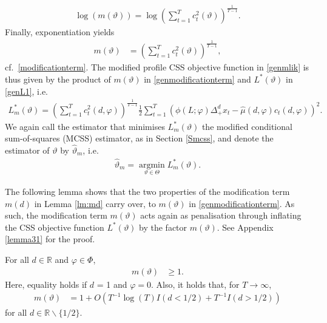 {{\begin{align*}
   \log\left(  m(\vartheta) \right) =  \log \left( \sum_{t = 1}^T c^2_{t}(\vartheta) \right)^{\frac{1}{T-1}}.
\end{align*}
Finally, exponentiation yields
\begin{align}
     m(\vartheta) &= \left( \sum_{t = 1}^T c^2_t(\vartheta)  \right)^{\frac{1}{T-1}}, \label{genmodificationterm}
\end{align}
cf.\ \eqref{modificationterm}. The modified profile CSS objective function in \eqref{genmlik} is thus given by the product of $ m(\vartheta)$ in \eqref{genmodificationterm} and $ L^*(\vartheta)$ in \eqref{genL1}, i.e.\
\begin{align*}
   L_m^*(\vartheta) = \left( \sum_{t = 1}^T c^2_t(d,\varphi)  \right)^{\frac{1}{T-1}}  \frac{1}{2} \sum_{t = 1}^T \left(  \phi(L;\varphi)\Delta_{+}^{d} x_t- \hat{\mu}(d,\varphi) c_t(d,\varphi)  \right)^2 .
\end{align*}
We again call the estimator that minimises $L_m^*(\vartheta)$ the modified conditional sum-of-squares (MCSS) estimator, as in Section \ref{Smcss}, and denote the estimator of $\vartheta$ by $\hat{\vartheta}_{m}$, i.e.\,
\begin{align}
    \hat{\vartheta}_{m} = \operatorname*{argmin}_{\vartheta \in \Theta} L^*_{m}(\vartheta).  \label{MCSSgen1}
\end{align}

The following lemma shows that the two properties of the modification term $m(d)$ in Lemma \ref{lm:md} carry over, to $m(\vartheta)$ in \eqref{genmodificationterm}. As such, the modification term $m(\vartheta)$ acts again as penalisation through inflating the CSS objective function $L^*(\vartheta)$ by the factor $m(\vartheta)$. See Appendix \ref{lemma31} for the proof.     

\begin{lemma} \label{gen:lm:md}
  For all $d \in \mathbb{R} $ and $\varphi \in \Phi$,
  \begin{align}
    m(\vartheta) &\geq 1. \label{genmqeq1}
    \end{align}
Here, equality holds if $d$ = 1 and $\varphi = 0$.
Also, it holds that, for $T \rightarrow \infty$,
    \begin{align}
    m(\vartheta) &= 1 + O(T^{-1}\log(T) I(d < 1/2) + T^{-1} I(d > 1/2) ) \label{geneq111} 
  \end{align}
   for all $d \in \mathbb{R} \backslash \{1/2\}$. 
\end{lemma}



}}
